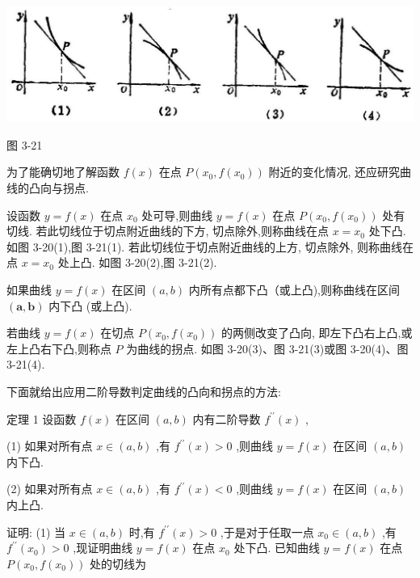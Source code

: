 \documentclass[10pt]{article}
\begin{document}
\begin{center}
\includegraphics[max width=1.0\textwidth]{images/01912c18-5c3f-733d-b775-749ba9897a9d_165_929562.jpg}
\end{center}

图 3-21

为了能确切地了解函数 \(f\left( x\right)\) 在点 \(P\left( {{x}_{0},f\left( {x}_{0}\right) }\right)\) 附近的变化情况, 还应研究曲线的凸向与拐点.

设函数 \(y = f\left( x\right)\) 在点 \({x}_{0}\) 处可导,则曲线 \(y = f\left( x\right)\) 在点 \(P\left( {{x}_{0},f\left( {x}_{0}\right) }\right)\) 处有切线. 若此切线位于切点附近曲线的下方, 切点除外,则称曲线在点 \(x = {x}_{0}\) 处下凸. 如图 3-20(1),图 3-21(1). 若此切线位于切点附近曲线的上方, 切点除外, 则称曲线在点 \(x = {x}_{0}\) 处上凸. 如图 3-20(2),图 3-21(2).

如果曲线 \(y = f\left( x\right)\) 在区间 \(\left( {a,b}\right)\) 内所有点都下凸（或上凸),则称曲线在区间 \(\left( {\mathbf{a},\mathbf{b}}\right)\) 内下凸 (或上凸).

若曲线 \(y = f\left( x\right)\) 在切点 \(P\left( {{x}_{0},f\left( {x}_{0}\right) }\right)\) 的两侧改变了凸向, 即左下凸右上凸,或左上凸右下凸,则称点 \(P\) 为曲线的拐点. 如图 3-20(3)、图 3-21(3)或图 3-20(4)、图 3-21(4).

下面就给出应用二阶导数判定曲线的凸向和拐点的方法:

定理 1 设函数 \(f\left( x\right)\) 在区间 \(\left( {a,b}\right)\) 内有二阶导数 \({f}^{\prime \prime }\left( x\right)\) ,

(1) 如果对所有点 \(x \in \left( {a,b}\right)\) ,有 \({f}^{\prime \prime }\left( x\right) > 0\) ,则曲线 \(y = f\left( x\right)\) 在区间 \(\left( {a,b}\right)\) 内下凸.

(2) 如果对所有点 \(x \in \left( {a,b}\right)\) ,有 \({f}^{\prime \prime }\left( x\right) < 0\) ,则曲线 \(y = f\left( x\right)\) 在区间 \(\left( {a,b}\right)\) 内上凸.

证明: (1) 当 \(x \in \left( {a,b}\right)\) 时,有 \({f}^{\prime \prime }\left( x\right) > 0\) ,于是对于任取一点 \({x}_{0} \in \left( {a,b}\right)\) ,有 \({f}^{\prime \prime }\left( {x}_{0}\right) > 0\) ,现证明曲线 \(y = f\left( x\right)\) 在点 \({x}_{0}\) 处下凸. 已知曲线 \(y = f\left( x\right)\) 在点 \(P\left( {{x}_{0},f\left( {x}_{0}\right) }\right)\) 处的切线为
\end{document}
